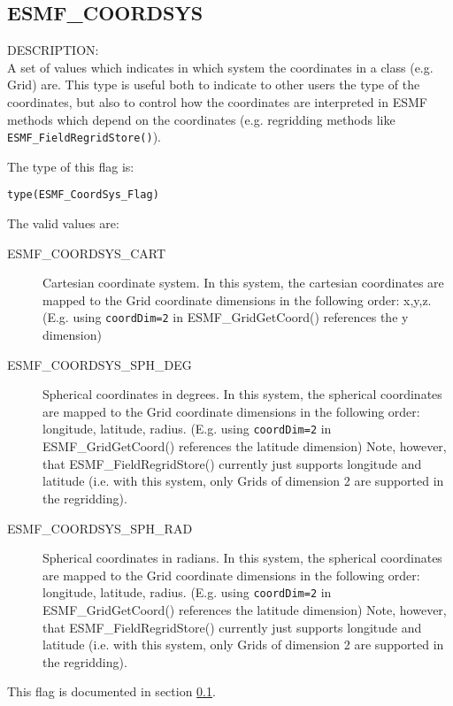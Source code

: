 \subsection{ESMF\_COORDSYS}
\label{const:coordsys}

{\sf DESCRIPTION:\\}
 A set of values which indicates in which system the coordinates in a class (e.g. Grid) are. This type is useful both
to indicate to other users the type of the coordinates, but also to control how the coordinates are interpreted in ESMF
methods which depend on the coordinates (e.g. regridding methods like {\tt ESMF\_FieldRegridStore()}).

The type of this flag is:

{\tt type(ESMF\_CoordSys\_Flag)}

The valid values are:
\begin{description}
\item [ESMF\_COORDSYS\_CART] Cartesian coordinate system. In this system, the cartesian coordinates are mapped to the Grid coordinate dimensions in the following order: x,y,z. (E.g. using {\tt coordDim=2} in ESMF\_GridGetCoord() references the y dimension) 

\item [ESMF\_COORDSYS\_SPH\_DEG] Spherical coordinates in degrees. In this system, the spherical coordinates are mapped to the Grid coordinate dimensions in the following order: longitude, latitude, radius. (E.g. using {\tt coordDim=2} in ESMF\_GridGetCoord() references the latitude dimension) Note, however, that ESMF\_FieldRegridStore() currently just supports longitude and latitude (i.e. with this system, only Grids of dimension 2 are supported in the regridding).

\item [ESMF\_COORDSYS\_SPH\_RAD] Spherical coordinates in radians. In this system, the spherical coordinates are mapped to the Grid coordinate dimensions in the following order: longitude, latitude, radius. (E.g. using {\tt coordDim=2} in ESMF\_GridGetCoord() references the latitude dimension) Note, however, that ESMF\_FieldRegridStore() currently just supports longitude and latitude (i.e. with this system, only Grids of dimension 2 are supported in the regridding).

\end{description}



This flag is documented in section \ref{const:coordsys}.


